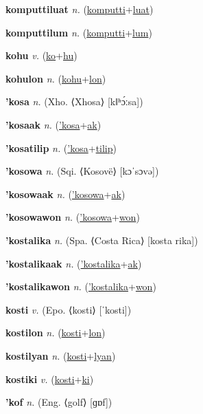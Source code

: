 \textbf{\hypertarget{komputtiluat}{komputtiluat}} \textit{n.} (\hyperlink{komputti}{komputti}+\allowbreak \hyperlink{luat}{luat})


\textbf{\hypertarget{komputtilum}{komputtilum}} \textit{n.} (\hyperlink{komputti}{komputti}+\allowbreak \hyperlink{lum}{lum})


\textbf{\hypertarget{kohu}{kohu}} \textit{v.} (\hyperlink{ko}{ko}+\allowbreak \hyperlink{hu}{hu})


\textbf{\hypertarget{kohulon}{kohulon}} \textit{n.} (\hyperlink{kohu}{kohu}+\allowbreak \hyperlink{lon}{lon})


\textbf{\hypertarget{'kosa}{'kosa}} \textit{n.} (Xho. ⟨Xhosa⟩ [kǁʰɔ́ːsa])


\textbf{\hypertarget{'kosaak}{'kosaak}} \textit{n.} (\hyperlink{'kosa}{'kosa}+\allowbreak \hyperlink{ak}{ak})


\textbf{\hypertarget{'kosatilip}{'kosatilip}} \textit{n.} (\hyperlink{'kosa}{'kosa}+\allowbreak \hyperlink{tilip}{tilip})


\textbf{\hypertarget{'kosowa}{'kosowa}} \textit{n.} (Sqi. ⟨Kosovë⟩ [kɔˈsɔvə])


\textbf{\hypertarget{'kosowaak}{'kosowaak}} \textit{n.} (\hyperlink{'kosowa}{'kosowa}+\allowbreak \hyperlink{ak}{ak})


\textbf{\hypertarget{'kosowawon}{'kosowawon}} \textit{n.} (\hyperlink{'kosowa}{'kosowa}+\allowbreak \hyperlink{won}{won})


\textbf{\hypertarget{'kostalika}{'kostalika}} \textit{n.} (Spa. ⟨Costa Rica⟩ [kosta rika])


\textbf{\hypertarget{'kostalikaak}{'kostalikaak}} \textit{n.} (\hyperlink{'kostalika}{'kostalika}+\allowbreak \hyperlink{ak}{ak})


\textbf{\hypertarget{'kostalikawon}{'kostalikawon}} \textit{n.} (\hyperlink{'kostalika}{'kostalika}+\allowbreak \hyperlink{won}{won})


\textbf{\hypertarget{kosti}{kosti}} \textit{v.} (Epo. ⟨kosti⟩ [ˈkosti])


\textbf{\hypertarget{kostilon}{kostilon}} \textit{n.} (\hyperlink{kosti}{kosti}+\allowbreak \hyperlink{lon}{lon})


\textbf{\hypertarget{kostilyan}{kostilyan}} \textit{n.} (\hyperlink{kosti}{kosti}+\allowbreak \hyperlink{lyan}{lyan})


\textbf{\hypertarget{kostiki}{kostiki}} \textit{v.} (\hyperlink{kosti}{kosti}+\allowbreak \hyperlink{ki}{ki})


\textbf{\hypertarget{'kof}{'kof}} \textit{n.} (Eng. ⟨golf⟩ [ɡɒf])


